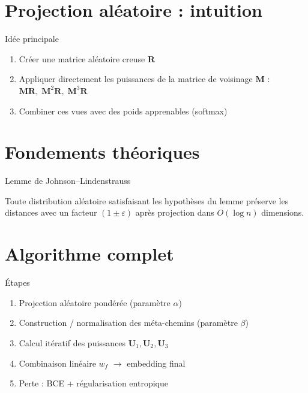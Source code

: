 \documentclass[9pt,aspectratio=169,professionalfonts]{beamer}
\begin{document}
\section{Projection aléatoire : intuition}

\begin{frame}{Idée principale}
\begin{enumerate}
  \item Créer une matrice aléatoire creuse $\mathbf R$
  \item Appliquer directement les puissances de la matrice de voisinage $\mathbf M$ : $\mathbf M\mathbf R,\;\mathbf M^2\mathbf R,\;\mathbf M^3\mathbf R$
  \item Combiner ces vues avec des poids apprenables (softmax)
\end{enumerate}
\end{frame}

\section{Fondements théoriques}

\begin{frame}{Lemme de Johnson–Lindenstrauss}
\begin{theorem}
Toute distribution aléatoire satisfaisant les hypothèses du lemme préserve les distances avec un facteur $(1\pm\varepsilon)$ après projection dans $O(\log n)$ dimensions.
\end{theorem}
\end{frame}

\section{Algorithme complet}

\begin{frame}{Étapes}
\begin{enumerate}
 \item Projection aléatoire pondérée (paramètre $\alpha$)
 \item Construction / normalisation des méta-chemins (paramètre $\beta$)
 \item Calcul itératif des puissances $\mathbf U_1,\mathbf U_2,\mathbf U_3$
 \item Combinaison linéaire \(w_f\) $\rightarrow$ embedding final
 \item Perte : BCE + régularisation entropique
\end{enumerate}
\end{frame}
\end{document}
